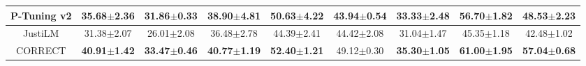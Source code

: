 \begin{table*}[t]
{\begin{tabular}{c|cc|cc|cc|cc}
                \hline
                P-Tuning v2 & 35.68$ \pm $2.36 & 31.86$ \pm $0.33 & 38.90$ \pm $4.81 & 50.63$ \pm $4.22 & 43.94$ \pm $0.54 & 33.33$ \pm $2.48 & 56.70$ \pm $1.82 & 48.53$ \pm $2.23 \\
                \hline
                JustiLM & 31.38$ \pm $2.07 & 26.01$ \pm $2.08 & 36.48$ \pm $2.78 & 44.39$ \pm $2.41 & 44.42$ \pm $2.08 & 31.04$ \pm $1.47 & 45.35$ \pm $1.18 & 42.48$ \pm $1.02 \\
                \hline
                CORRECT & \textbf{40.91}$ \pm $\textbf{1.42} & \textbf{33.47}$ \pm $\textbf{0.46} & \textbf{40.77}$ \pm $\textbf{1.19} & \textbf{52.40}$ \pm $\textbf{1.21} & 49.12$ \pm $0.30 & \textbf{35.30}$ \pm $\textbf{1.05} & \textbf{61.00}$ \pm $\textbf{1.95} & \textbf{57.04}$ \pm $\textbf{0.68} \\
			\bottomrule
		\end{tabular}
	}
	\label{table:5_shot_macro_f1}
\end{table*}
